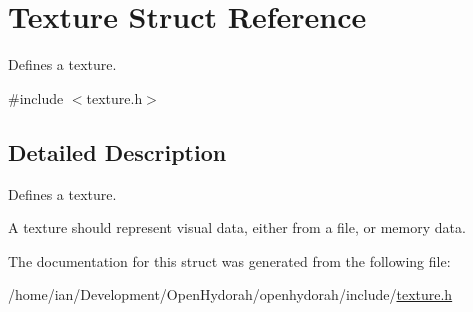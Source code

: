 \hypertarget{structTexture}{\section{Texture Struct Reference}
\label{structTexture}
}


Defines a texture.  




{\ttfamily \#include $<$texture.\-h$>$}



\subsection{Detailed Description}
Defines a texture. 

A texture should represent visual data, either from a file, or memory data. 

The documentation for this struct was generated from the following file\-:\begin{DoxyCompactItemize}
\item 
/home/ian/\-Development/\-Open\-Hydorah/openhydorah/include/\hyperlink{texture_8h}{texture.\-h}\end{DoxyCompactItemize}
